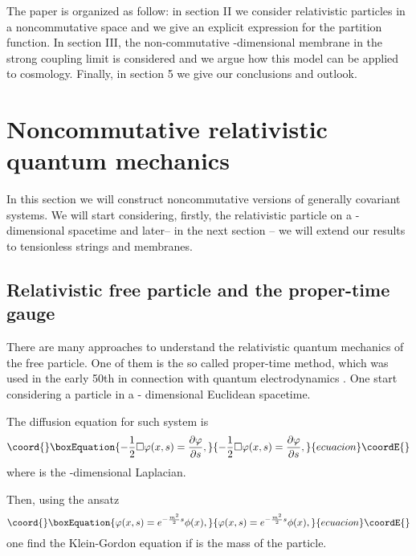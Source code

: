 \documentclass[a4paper,aps,twocolumn,amsfonts]{revtex4}
\begin{document}
   The paper is organized as follow: in section II we consider relativistic particles  in a noncommutative space and we give an explicit expression for the partition function. In section III, the non-commutative \coordHE{}-dimensional membrane in the strong coupling limit is considered and we argue how this model can be applied to cosmology. Finally, in section 5 we give our conclusions and outlook.

   \section{Noncommutative relativistic quantum mechanics}

   In this section we will construct noncommutative versions of generally covariant systems. We will start considering, firstly, the relativistic particle on a \coordHE{}-dimensional spacetime and later-- in the next section -- we will extend our results to tensionless strings and membranes.

   \subsection{Relativistic free particle and the proper-time gauge}

   There are many approaches to understand the relativistic quantum mechanics of the free particle. One of them is the so called proper-time method, which was used   in the early 50th in connection with quantum electrodynamics \cite{nambu}. One start considering a particle in a \coordHE{}- dimensional Euclidean  spacetime.

   The diffusion equation for such system is
   \begin{equation}\coord{}\boxEquation{
   -\frac{1}{2} \Box \varphi (x, s) =  \frac{\partial \varphi}{\partial s},
   \label{6}
   }{
   -\frac{1}{2} \Box \varphi (x, s) =  \frac{\partial \varphi}{\partial s},
   }{ecuacion}\coordE{}\end{equation}
   where \myHighlight{$\Box$}\coordHE{} is the \coordHE{}-dimensional Laplacian.

   Then, using the ansatz
   \begin{equation}\coord{}\boxEquation{
   \varphi (x,s) = e^{-\frac{m^2}{2} s} \phi (x), \label{7}
   }{
   \varphi (x,s) = e^{-\frac{m^2}{2} s} \phi (x), }{ecuacion}\coordE{}\end{equation}
one find the Klein-Gordon equation if \coordHE{} is the mass of the particle.
\end{document}
